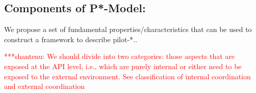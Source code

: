 \documentclass[]{article}
\newcommand{\jhanote}[1]{ {\textcolor{red} { ***shantenu: #1 }}}
\newcommand{\jhanote}[1]{}
\begin{document}
% 
% 


\subsection{Components of P*-Model:}

We propose a set of fundamental properties/characteristics that can be
used to construct a framework to describe pilot-*..

\jhanote{We should divide into two categories: those aspects that are
  exposed at the API level, i.e., which are purely internal or either
  need to be exposed to the external environment. See classification
  of internal coordination and external coordination}
\end{document}
